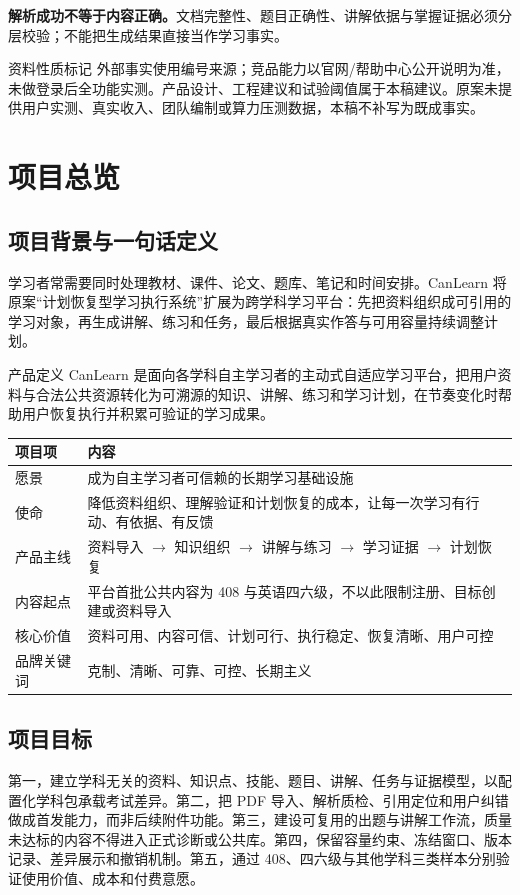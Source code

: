 \documentclass[UTF8,a4paper,11pt,fontset=none]{ctexart}
\newcommand{\cth}[1]{\textbf{\sffamily #1}}
\newcommand{\newsec}[1]{\clearpage\section{#1}}
\newenvironment{tbl}{\par\vspace{3pt}\small\noindent\ignorespaces}{\unskip\par\vspace{5pt}}
\begin{document}
\textbf{解析成功不等于内容正确。}文档完整性、题目正确性、讲解依据与掌握证据必须分层校验；不能把生成结果直接当作学习事实。

\begin{caution}{资料性质标记}
外部事实使用编号来源；竞品能力以官网/帮助中心公开说明为准，未做登录后全功能实测。产品设计、工程建议和试验阈值属于本稿建议。原案未提供用户实测、真实收入、团队编制或算力压测数据，本稿不补写为既成事实。
\end{caution}

\newsec{项目总览}
\subsection{项目背景与一句话定义}
学习者常需要同时处理教材、课件、论文、题库、笔记和时间安排。CanLearn 将原案“计划恢复型学习执行系统”扩展为跨学科学习平台：先把资料组织成可引用的学习对象，再生成讲解、练习和任务，最后根据真实作答与可用容量持续调整计划。\cite{original}

\begin{insight}{产品定义}
CanLearn 是面向各学科自主学习者的主动式自适应学习平台，把用户资料与合法公共资源转化为可溯源的知识、讲解、练习和学习计划，在节奏变化时帮助用户恢复执行并积累可验证的学习成果。
\end{insight}

\begin{tbl}
\begin{tabularx}{\linewidth}{@{}L{27mm}Y@{}}
\toprule
\cth{项目项}&\cth{内容}\\\midrule
愿景&成为自主学习者可信赖的长期学习基础设施\\
使命&降低资料组织、理解验证和计划恢复的成本，让每一次学习有行动、有依据、有反馈\\
产品主线&资料导入 $\rightarrow$ 知识组织 $\rightarrow$ 讲解与练习 $\rightarrow$ 学习证据 $\rightarrow$ 计划恢复\\
内容起点&平台首批公共内容为 408 与英语四六级，不以此限制注册、目标创建或资料导入\\
核心价值&资料可用、内容可信、计划可行、执行稳定、恢复清晰、用户可控\\
品牌关键词&克制、清晰、可靠、可控、长期主义\\
\bottomrule
\end{tabularx}
\end{tbl}

\subsection{项目目标}
第一，建立学科无关的资料、知识点、技能、题目、讲解、任务与证据模型，以配置化学科包承载考试差异。第二，把 PDF 导入、解析质检、引用定位和用户纠错做成首发能力，而非后续附件功能。第三，建设可复用的出题与讲解工作流，质量未达标的内容不得进入正式诊断或公共库。第四，保留容量约束、冻结窗口、版本记录、差异展示和撤销机制。第五，通过 408、四六级与其他学科三类样本分别验证使用价值、成本和付费意愿。
\end{document}
